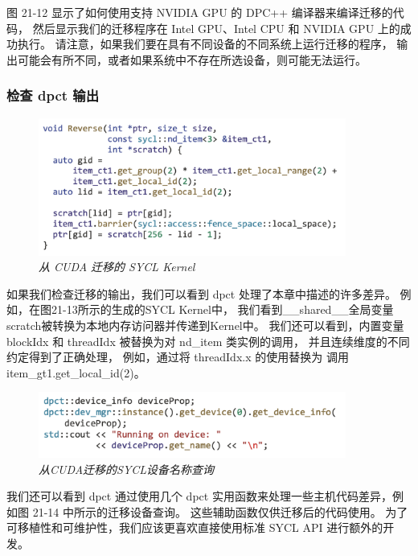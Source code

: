 图 21-12 显示了如何使用支持 NVIDIA GPU 的 DPC++ 编译器来编译迁移的代码，
然后显示我们的迁移程序在 Intel GPU、Intel CPU 和 NVIDIA GPU 上的成功执行。 
请注意，如果我们要在具有不同设备的不同系统上运行迁移的程序，
输出可能会有所不同，或者如果系统中不存在所选设备，则可能无法运行。

\subsubsection{检查 dpct 输出}

\begin{figure}[H]
	\centering
	\includegraphics[width=0.9\textwidth]{figs/F21.13.png}
	\caption{\textit{从 CUDA 迁移的 SYCL Kernel }}
\end{figure}

如果我们检查迁移的输出，我们可以看到 dpct 处理了本章中描述的许多差异。 
例如，在图21-13所示的生成的SYCL Kernel中，
我们看到\_\_shared\_\_全局变量scratch被转换为本地内存访问器并传递到Kernel中。 
我们还可以看到，内置变量 blockIdx 和 threadIdx 被替换为对 nd\_item 类实例的调用，
并且连续维度的不同约定得到了正确处理，
例如，通过将 threadIdx.x 的使用替换为 调用 item\_gt1.get\_local\_id(2)。

\begin{figure}[H]
	\centering
	\includegraphics[width=0.9\textwidth]{figs/F21.14.png}
	\caption{\textit{从CUDA迁移的SYCL设备名称查询 }}
\end{figure}

我们还可以看到 dpct 通过使用几个 dpct 实用函数来处理一些主机代码差异，例如图 21-14 中所示的迁移设备查询。 
这些辅助函数仅供迁移后的代码使用。 为了可移植性和可维护性，我们应该更喜欢直接使用标准 SYCL API 进行额外的开发。

